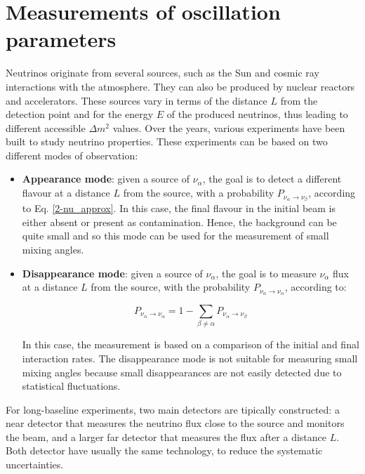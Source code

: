 \section{Measurements of oscillation parameters}
Neutrinos originate from several sources, such as the Sun and cosmic ray interactions with the atmosphere. They can also be produced by nuclear reactors and accelerators. These sources vary in terms of the distance $L$ from the detection point and for the energy $E$ of the produced neutrinos, thus leading to different accessible $\Delta m^2$ values.
Over the years, various experiments have been built to study neutrino properties. 
These experiments can be based on two different modes of observation: 
\begin{itemize}
    \item \textbf{Appearance mode}: given a source of $\nu_\alpha$, the goal is to detect a different flavour at a distance $L$ from the source, with a probability $P_{\nu_{\alpha} \rightarrow \nu_{\beta}}$, according to Eq. \ref{2-nu_approx}. In this case, the final flavour in the initial beam is either absent or present as contamination. Hence, the background can be quite small and so this mode can be used for the measurement of small mixing angles.
    \item \textbf{Disappearance mode}: given a source of $\nu_\alpha$, the goal is to measure $\nu_\alpha$ flux at a distance $L$ from the source, with the  probability $P_{\nu_{\alpha} \rightarrow \nu_{\alpha}}$, according to: 
    
    \begin{equation}
    \label{disapp_prob}
        P_{\nu_{\alpha} \rightarrow \nu_{\alpha}} = 1 - \sum_{\beta \neq \alpha} P_{\nu_{\alpha} \rightarrow \nu_{\beta}}
    \end{equation}
    
    In this case, the measurement is based on a comparison of the initial and final interaction rates.  The disappearance mode is not suitable for measuring small mixing angles because small disappearances are not easily detected due to statistical fluctuations. 
    \end{itemize}

For long-baseline experiments, two main detectors are tipically constructed: a near detector that measures the neutrino flux close to the source and monitors the beam, and a larger far detector that measures the flux after a distance $L$. Both detector have usually the same technology, to reduce the systematic uncertainties.

